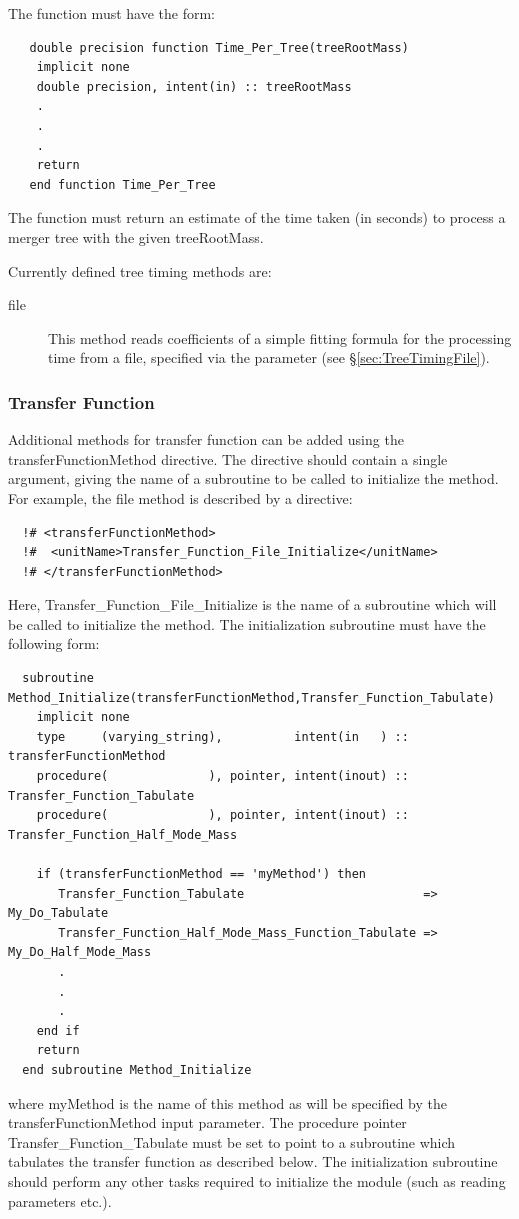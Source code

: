 The function must have the form:
\begin{verbatim}
   double precision function Time_Per_Tree(treeRootMass)
    implicit none
    double precision, intent(in) :: treeRootMass
    .
    .
    .
    return
   end function Time_Per_Tree 
\end{verbatim}
The function must return an estimate of the time taken (in seconds) to process a merger tree with the given {\normalfont \ttfamily treeRootMass}.

Currently defined tree timing methods are:
\begin{description}
 \item [{\normalfont \ttfamily file}] This method reads coefficients of a simple fitting formula for the processing time from a file, specified via the {\normalfont \ttfamily [timePerTreeFitFileName]} parameter (see \S\ref{sec:TreeTimingFile}).
\end{description}

\subsubsection{Transfer Function}\label{sec:TransferFunctionMethod}

Additional methods for transfer function can be added using the {\normalfont \ttfamily transferFunctionMethod} directive. The directive should contain a single argument, giving the name of a subroutine to be called to initialize the method. For example, the {\normalfont \ttfamily file} method is described by a directive:
\begin{verbatim}
  !# <transferFunctionMethod>
  !#  <unitName>Transfer_Function_File_Initialize</unitName>
  !# </transferFunctionMethod>
\end{verbatim}
Here, {\normalfont \ttfamily Transfer\_Function\_File\_Initialize} is the name of a subroutine which will be called to initialize the method. The initialization subroutine must have the following form:
\begin{verbatim}
  subroutine Method_Initialize(transferFunctionMethod,Transfer_Function_Tabulate)
    implicit none
    type     (varying_string),          intent(in   ) :: transferFunctionMethod
    procedure(              ), pointer, intent(inout) :: Transfer_Function_Tabulate
    procedure(              ), pointer, intent(inout) :: Transfer_Function_Half_Mode_Mass

    if (transferFunctionMethod == 'myMethod') then
       Transfer_Function_Tabulate                         => My_Do_Tabulate
       Transfer_Function_Half_Mode_Mass_Function_Tabulate => My_Do_Half_Mode_Mass
       .
       .
       .
    end if
    return
  end subroutine Method_Initialize
\end{verbatim}
where {\normalfont \ttfamily myMethod} is the name of this method as will be specified by the {\normalfont \ttfamily transferFunctionMethod} input parameter. The procedure pointer {\normalfont \ttfamily Transfer\_Function\_Tabulate} must be set to point to a subroutine which tabulates the transfer function as described below. The initialization subroutine should perform any other tasks required to initialize the module (such as reading parameters etc.).

